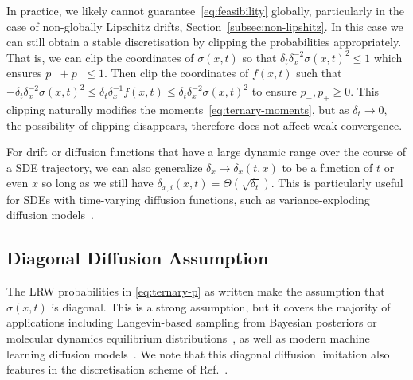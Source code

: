 \documentclass[pra,showpacs,amsmath,amssymb,amsfonts,lengthcheck,longbibliography,onecolumn]{revtex4-2}
\newcommand{\samd}[1]{{\color[RGB]{250, 0, 250}{SD: #1}}}
\begin{document}



In practice, we likely cannot guarantee~\eqref{eq:feasibility} globally, particularly in
the case of non-globally Lipschitz drifts, Section~\ref{subsec:non-lipshitz}. In this
case we can still obtain a stable discretisation by clipping the probabilities
appropriately. That is, we can clip the coordinates of $\sigma(x, t)$ so that
$\delta_t \delta_x^{-2} \sigma(x, t)^2 \leq 1$ which ensures $p_- + p_+ \leq 1$.
Then clip the coordinates of $f(x,t)$ such that $-\delta_t \delta_x^{-2} \sigma(x, t)^2 \leq \delta_t \delta_x^{-1} f(x, t) \leq \delta_t \delta_x^{-2} \sigma(x, t)^2$
to ensure $p_-, p_+ \geq 0$. This clipping naturally modifies the moments~\eqref{eq:ternary-moments},
but as $\delta_t \to 0,$ the possibility of clipping disappears, therefore does not
affect weak convergence.


For drift or diffusion functions that have a large
dynamic range over the course of a SDE trajectory, we can also generalize
$\delta_x \to \delta_x(t, x)$ to
be a function of $t$ or even $x$ so long as we still have $\delta_{x, i}(x,t) = \Theta(\sqrt{\delta_t})$. This is particularly useful for SDEs with time-varying
diffusion functions, such as variance-exploding diffusion models~\cite{song2020score}.



\subsection{Diagonal Diffusion Assumption}\label{subsec:diag_diffusion}

The LRW probabilities in \eqref{eq:ternary-p} as written make the
assumption that $\sigma(x,t)$ is diagonal. This is a strong assumption, but it covers
the majority of applications including Langevin-based sampling from Bayesian posteriors
\cite{duffield2024scalable} or molecular dynamics equilibrium distributions~\cite{leimkuhler2013rational},
as well as modern machine learning diffusion models~\cite{song2020score}.
We note that this diagonal diffusion limitation also features in
the discretisation scheme of Ref.~\cite{iguchi2024skew}.
\end{document}
